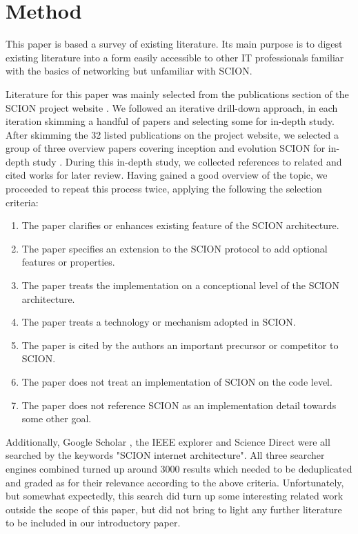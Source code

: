 \documentclass[../eva1_scion.tex]{subfiles}
\begin{document}
\section{Method}\label{sec:method}

    This paper is based a survey of existing literature. Its main purpose is to digest existing literature into a form easily accessible to other IT professionals familiar with the basics of networking but unfamiliar with SCION.

       Literature for this paper was mainly selected from the publications section of the SCION project website \cite{scion_website}. We followed an iterative drill-down approach, in each iteration skimming a handful of papers and selecting some for in-depth study. After skimming the 32 listed publications on the project website, we selected a group of three overview papers covering inception and evolution SCION for in-depth study \cite{scion_2011, scion_2015, scion_2017}. During this in-depth study, we collected references to related and cited works for later review. Having gained a good overview of the topic, we proceeded to repeat this process twice, applying the following the selection criteria:

    \begin{enumerate}
        \item The paper clarifies or enhances existing feature of the SCION architecture.
        \item The paper specifies an extension to the SCION protocol to add optional features or properties.
        \item The paper treats the implementation on a conceptional level of the SCION architecture.
        \item The paper treats a technology or mechanism adopted in SCION.
        \item The paper is cited by the authors an important precursor or competitor to SCION.
        \item The paper does not treat an implementation of SCION on the code level.
        \item The paper does not reference SCION as an implementation detail towards some other goal.
    \end{enumerate}

    Additionally, Google Scholar \cite{google_scholar}, the IEEE explorer \cite{i3e_explorer} and Science Direct \cite{science_direct} were all searched by the keywords "SCION internet architecture". All three searcher engines combined turned up around 3000 results which needed to be deduplicated and graded as for their relevance according to the above criteria. Unfortunately, but somewhat expectedly, this search did turn up some interesting related work outside the scope of this paper, but did not bring to light any further literature to be included in our introductory paper.
\end{document}
